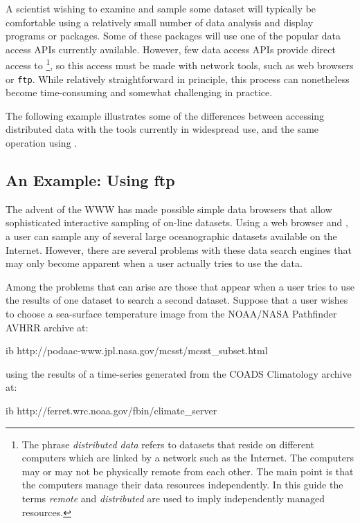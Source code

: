 A scientist wishing to examine and sample some dataset will typically
be comfortable using a relatively small number of data analysis and
display programs or packages. Some of these packages will use one of
the popular data access APIs currently available. However, few data
access APIs provide direct access to 
\footnote{The phrase {\em distributed data\/}
refers to datasets that reside on different computers which are linked
by a network such as the Internet. The computers may or may not be
physically remote from each other. The main point is that the
computers manage their data resources independently. In this guide the
terms {\em remote\/} and {\em distributed\/} are used to imply
independently managed resources.}, so this access must be made with
network tools, such as web browsers or {\tt ftp}. While
relatively straightforward in principle, this process can nonetheless
become time-consuming and somewhat challenging in practice.

The following example illustrates some of the differences between
accessing distributed data with the tools currently in widespread use,
and the same operation using \opendap.

\subsection{An Example: Using ftp}
\label{intro,ftp-example}

The advent of the WWW has made possible simple data browsers that
allow sophisticated interactive sampling of on-line datasets. Using a
web browser and {\tt{}}, a user can sample any of several large
oceanographic datasets available on the Internet. However, there are
several problems with these data search engines that may only become
apparent when a user actually tries to use the data.

Among the problems that can arise are those that appear when a user
tries to use the results of one dataset to search a second
dataset. Suppose that a user wishes to choose a sea-surface
temperature image from the NOAA/NASA Pathfinder AVHRR archive at:

\begin{vcode}{ib}
http://podaac-www.jpl.nasa.gov/mcsst/mcsst_subset.html
\end{vcode}

using the results of a
time-series generated from the COADS Climatology archive at:

\begin{vcode}{ib}
http://ferret.wrc.noaa.gov/fbin/climate_server   
\end{vcode}

